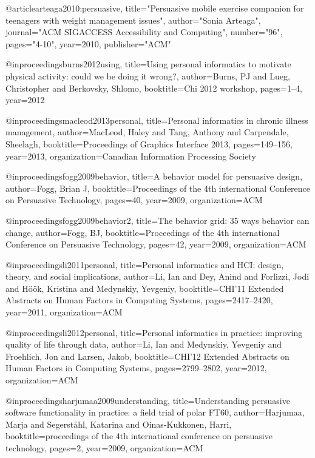 @article{arteaga2010:persuasive,
  title="Persuasive mobile exercise companion for teenagers with weight management issues",
  author="Sonia Arteaga",
  journal="ACM SIGACCESS Accessibility and Computing",
  number="96",
  pages="4-10",
  year={2010},
  publisher="ACM"
}

@inproceedings{burns2012using,
  title={Using personal informatics to motivate physical activity: could we be doing it wrong?},
  author={Burns, PJ and Lueg, Christopher and Berkovsky, Shlomo},
  booktitle={Chi 2012 workshop},
  pages={1--4},
  year={2012}
}

@inproceedings{macleod2013personal,
  title={Personal informatics in chronic illness management},
  author={MacLeod, Haley and Tang, Anthony and Carpendale, Sheelagh},
  booktitle={Proceedings of Graphics Interface 2013},
  pages={149--156},
  year={2013},
  organization={Canadian Information Processing Society}
}


@inproceedings{fogg2009behavior,
  title={A behavior model for persuasive design},
  author={Fogg, Brian J},
  booktitle={Proceedings of the 4th international Conference on Persuasive Technology},
  pages={40},
  year={2009},
  organization={ACM}
}

@inproceedings{fogg2009behavior2,
  title={The behavior grid: 35 ways behavior can change},
  author={Fogg, BJ},
  booktitle={Proceedings of the 4th international Conference on Persuasive Technology},
  pages={42},
  year={2009},
  organization={ACM}
}

@inproceedings{li2011personal,
  title={Personal informatics and HCI: design, theory, and social implications},
  author={Li, Ian and Dey, Anind and Forlizzi, Jodi and H{\"o}{\"o}k, Kristina and Medynskiy, Yevgeniy},
  booktitle={CHI'11 Extended Abstracts on Human Factors in Computing Systems},
  pages={2417--2420},
  year={2011},
  organization={ACM}
}


@inproceedings{li2012personal,
  title={Personal informatics in practice: improving quality of life through data},
  author={Li, Ian and Medynskiy, Yevgeniy and Froehlich, Jon and Larsen, Jakob},
  booktitle={CHI'12 Extended Abstracts on Human Factors in Computing Systems},
  pages={2799--2802},
  year={2012},
  organization={ACM}
}


@inproceedings{harjumaa2009understanding,
  title={Understanding persuasive software functionality in practice: a field trial of polar FT60},
  author={Harjumaa, Marja and Segerst{\aa}hl, Katarina and Oinas-Kukkonen, Harri},
  booktitle={proceedings of the 4th international conference on persuasive technology},
  pages={2},
  year={2009},
  organization={ACM}
}

